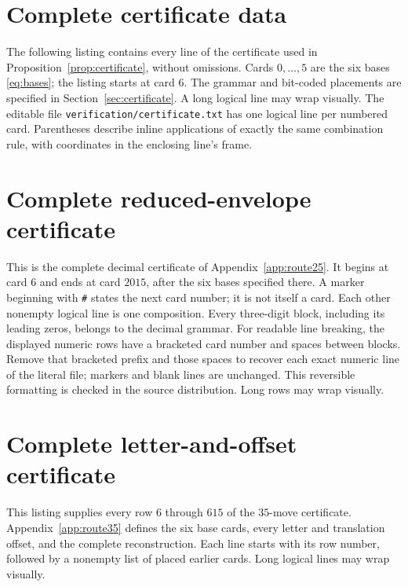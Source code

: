 \section{Complete certificate data}\label{app:data}

The following listing contains every line of the certificate used
in Proposition~\ref{prop:certificate}, without omissions.
Cards $0,\ldots,5$ are the six bases \eqref{eq:bases}; the listing
starts at card $6$. The grammar and bit-coded placements are
specified in Section~\ref{sec:certificate}.
A long logical line may wrap visually. The editable file
\texttt{verification/certificate.txt} has one logical line per numbered card.
Parentheses describe inline applications of exactly the same
combination rule, with coordinates in the enclosing line's frame.



\section{Complete reduced-envelope certificate}\label{app:data25}

This is the complete decimal certificate of Appendix~\ref{app:route25}.
It begins at card $6$ and ends at card $2015$, after the six bases
specified there. A marker beginning with \texttt{\#} states the next
card number; it is not itself a card. Each other nonempty logical line
is one composition. Every three-digit block, including its leading
zeros, belongs to the decimal grammar. For readable line breaking,
the displayed numeric rows have a bracketed card number and spaces
between blocks. Remove that bracketed prefix and those spaces to
recover each exact numeric line of the literal file; markers and blank
lines are unchanged. This reversible formatting is checked in the
source distribution. Long rows may wrap visually.



\section{Complete letter-and-offset certificate}\label{app:data35}

This listing supplies every row $6$ through $615$ of the $35$-move
certificate. Appendix~\ref{app:route35} defines the six base cards,
every letter and translation offset, and the complete reconstruction.
Each line starts with its row number, followed by a nonempty list of
placed earlier cards. Long logical lines may wrap visually.

